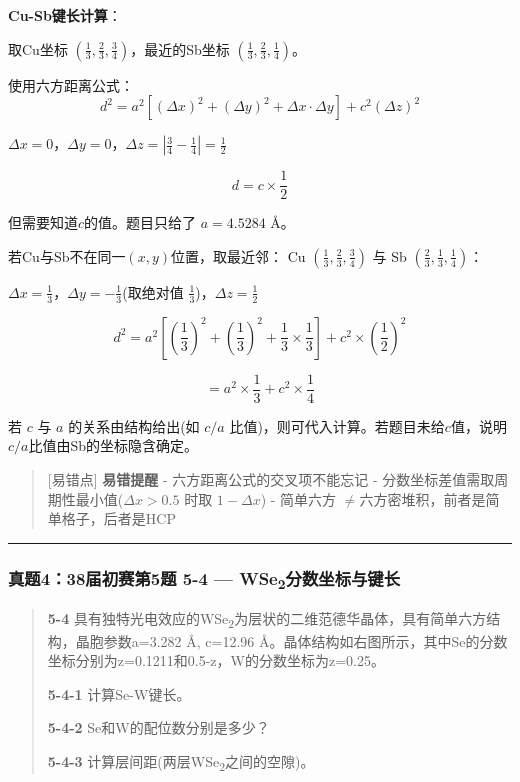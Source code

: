 \documentclass[a4paper,11pt]{ctexart}
\newcommand{\箭}{\ensuremath{\rightarrow}}
\newcommand{\左箭}{\ensuremath{\leftarrow}}
\newcommand{\上箭}{\ensuremath{\uparrow}}
\newcommand{\下箭}{\ensuremath{\downarrow}}
\newcommand{\衡}{\ensuremath{\rightleftharpoons}}
\newcommand{\双箭}{\ensuremath{\leftrightarrow}}
\newcommand{\约等于}{\ensuremath{\approx}}
\newcommand{\小于等于}{\ensuremath{\leq}}
\newcommand{\大于等于}{\ensuremath{\geq}}
\newcommand{\不等于}{\ensuremath{\neq}}
\newcommand{\西格马}{\ensuremath{\sigma}}
\newcommand{\派}{\ensuremath{\pi}}
\begin{document}
\textbf{Cu-Sb键长计算}：

取Cu坐标 \((\frac{1}{3}, \frac{2}{3}, \frac{3}{4})\)，最近的Sb坐标 \((\frac{1}{3}, \frac{2}{3}, \frac{1}{4})\)。

使用六方距离公式：
\[d^2 = a^2[(\Delta x)^2 + (\Delta y)^2 + \Delta x \cdot \Delta y] + c^2(\Delta z)^2\]

\(\Delta x = 0\)，\(\Delta y = 0\)，\(\Delta z = |\frac{3}{4} - \frac{1}{4}| = \frac{1}{2}\)

\[d = c \times \frac{1}{2}\]

但需要知道\(c\)的值。题目只给了 \(a = 4.5284\) Å。

若Cu与Sb不在同一\((x,y)\)位置，取最近邻：
Cu \((\frac{1}{3}, \frac{2}{3}, \frac{3}{4})\) 与 Sb \((\frac{2}{3}, \frac{1}{3}, \frac{1}{4})\)：

\(\Delta x = \frac{1}{3}\)，\(\Delta y = -\frac{1}{3}\)(取绝对值 \(\frac{1}{3}\))，\(\Delta z = \frac{1}{2}\)

\[d^2 = a^2\left[(\frac{1}{3})^2 + (\frac{1}{3})^2 + \frac{1}{3} \times \frac{1}{3}\right] + c^2 \times (\frac{1}{2})^2\]

\[= a^2 \times \frac{1}{3} + c^2 \times \frac{1}{4}\]

若 \(c\) 与 \(a\) 的关系由结构给出(如 \(c/a\) 比值)，则可代入计算。若题目未给\(c\)值，说明\(c/a\)比值由Sb的坐标隐含确定。

\begin{quote}
{[}易错点{]} \textbf{易错提醒}
- 六方距离公式的交叉项不能忘记
- 分数坐标差值需取周期性最小值(\(\Delta x > 0.5\) 时取 \(1 - \Delta x\))
- 简单六方 \不等于 六方密堆积，前者是简单格子，后者是HCP
\end{quote}

\begin{center}\rule{0.5\linewidth}{0.5pt}\end{center}

\subsubsection{\texorpdfstring{真题4：38届初赛第5题 5-4 --- WSe\textsubscript{2}分数坐标与键长}{真题4：38届初赛第5题 5-4 --- WSe2分数坐标与键长}}\label{ux771fux9898438ux5c4aux521dux8d5bux7b2c5ux9898-5-4-wse2ux5206ux6570ux5750ux6807ux4e0eux952eux957f}

\begin{quote}
\textbf{5-4} 具有独特光电效应的WSe\textsubscript{2}为层状的二维范德华晶体，具有简单六方结构，晶胞参数a=3.282 Å, c=12.96 Å。晶体结构如右图所示，其中Se的分数坐标分别为z=0.1211和0.5-z，W的分数坐标为z=0.25。

\textbf{5-4-1} 计算Se-W键长。

\textbf{5-4-2} Se和W的配位数分别是多少？

\textbf{5-4-3} 计算层间距(两层WSe\textsubscript{2}之间的空隙)。
\end{quote}
\end{document}
